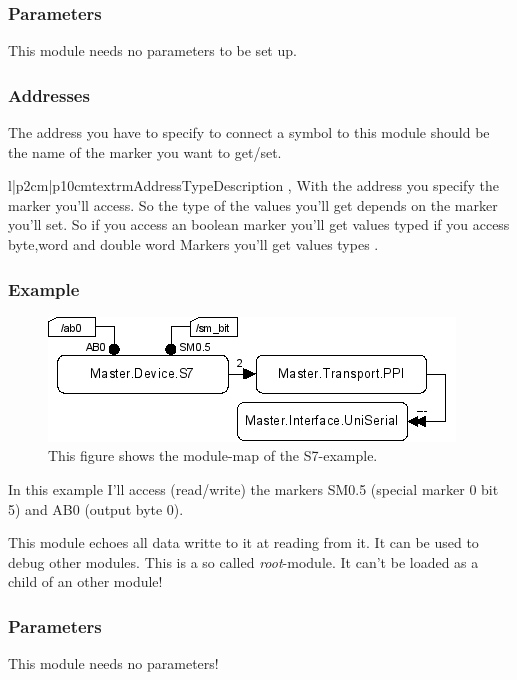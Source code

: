 \subsubsection{Parameters}
This module needs no parameters to be set up.

\subsubsection{Addresses}
The address you have to specify to connect a symbol to this module should be 
the name of the marker you want to get/set.
\begin{tableiii}{l|p{2cm}|p{10cm}}{textrm}{Address}{Type}{Description}
        {, }
        {With the address you specify the marker you'll access. So the type 
         of the values you'll get depends on the marker you'll set. So if you 
         access an boolean marker you'll get values typed  if you
         access byte,word and double word Markers you'll get values types
         .}
\end{tableiii}

\subsubsection{Example}
\begin{figure}[ht]
    \label{fig:coremod08}
    \centering
    \includegraphics{coremod08.png}
    \caption{This figure shows the module-map of the S7-example.}
\end{figure}    
In this example I'll access (read/write) the markers SM0.5 (special marker 0 bit 5) and AB0
(output byte 0).





%
%
This module echoes all data writte to it at reading from it. It can be used to
debug other modules. This is a so called \emph{root}-module. It can't be 
loaded as a child of an other module!

\subsubsection{Parameters}
This module needs no parameters!

